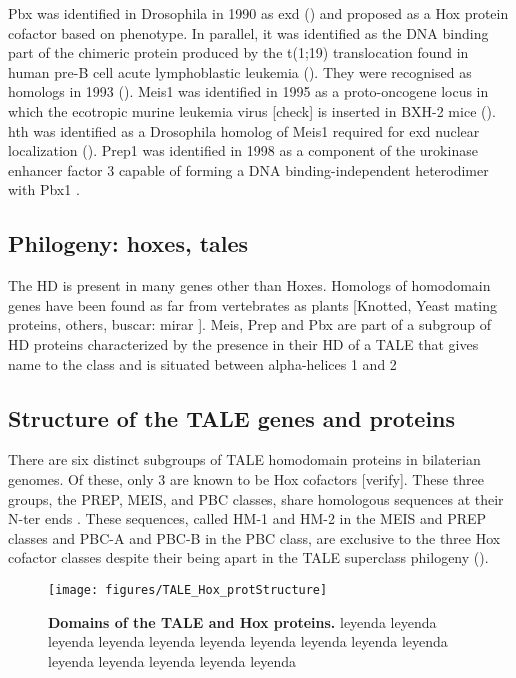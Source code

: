Pbx was identified in Drosophila in 1990 as \ac{exd} (\cite{Peifer1990}) and proposed as a Hox protein cofactor based on phenotype. In parallel, it was identified as the DNA binding part of the chimeric protein produced by the t(1;19) translocation found in human pre-B cell acute lymphoblastic leukemia (\cite{Kamps1990}). They were recognised as homologs in 1993 (\cite{Rauskolb1993}).
Meis1 was identified in 1995 as a proto-oncogene locus in which the ecotropic murine leukemia virus [check] is inserted in BXH-2 mice (\cite{Moskow1995}). \ac{hth} was identified as a Drosophila homolog of Meis1 required for \ac{exd} nuclear localization (\cite{Rauskolb1995, Rieckhof1997}).
Prep1 was identified in 1998 as a component of the urokinase enhancer factor 3 capable of forming a DNA binding-independent heterodimer with Pbx1 \cite{Berthelsen1998,Berthelsen1998a}.

\subsection{Philogeny: hoxes, tales}

The \ac{HD} is present in many genes other than Hoxes. Homologs of homodomain genes have been found as far from vertebrates as plants [Knotted, Yeast mating proteins, others, buscar: mirar \cite{Burglin1997}]. Meis, Prep and Pbx are part of a subgroup of \ac{HD} proteins characterized by the presence in their \ac{HD} of a \ac{TALE} that gives name to the class and is situated between alpha-helices 1 and 2 \cite{Bertolino1995, Burglin1997, Mukherjee2007, Moens2006}

\subsection{Structure of the TALE genes and proteins}

There are six distinct subgroups of \ac{TALE} homodomain proteins in bilaterian genomes. Of these, only 3 are known to be Hox cofactors [verify]. These three groups, the PREP, MEIS, and PBC classes, share homologous sequences at their \ac{N-ter} ends \cite{Burglin1998}. These sequences, called HM-1 and HM-2 in the MEIS and PREP classes and PBC-A and PBC-B in the PBC class, are exclusive to the three Hox cofactor classes despite their being apart in the \ac{TALE} superclass philogeny (\cite{Mukherjee2007}).

\begin{figure}[]
  
  \centering
  \texttt{[image: figures/TALE\_Hox\_protStructure]}
  \caption[Domains of the TALE and Hox proteins]{\textbf{Domains of the TALE and Hox proteins.} leyenda leyenda leyenda leyenda leyenda leyenda leyenda leyenda leyenda leyenda leyenda leyenda leyenda leyenda leyenda}
  \label{fig:TALE_Hox_protStructure}
\end{figure}


